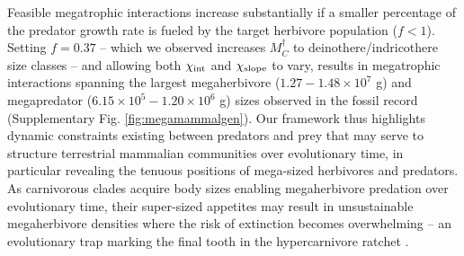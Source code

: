 \documentclass[]{rsos}%
\begin{document}
Feasible megatrophic interactions increase substantially if a smaller percentage of the predator growth rate is fueled by the target herbivore population ($f<1$).
Setting $f=0.37$ -- which we observed increases $M_C^\dagger$ to deinothere/indricothere size classes -- and allowing both $\chi_{\rm int}$ and $\chi_{\rm slope}$ to vary, results in megatrophic interactions spanning the largest megaherbivore ($1.27-1.48\times10^7$ g) and megapredator ($6.15\times10^5-1.20\times10^6$ g) sizes observed in the fossil record (Supplementary Fig. \ref{fig:megamammalgen}).
Our framework thus highlights dynamic constraints existing between predators and prey that may serve to structure terrestrial mammalian communities over evolutionary time, in particular revealing the tenuous positions of mega-sized herbivores and predators.
As carnivorous clades acquire body sizes enabling megaherbivore predation over evolutionary time, their super-sized appetites may result in unsustainable megaherbivore densities where the risk of extinction becomes overwhelming -- an evolutionary trap marking the final tooth in the hypercarnivore ratchet \cite[cf.][]{VanValkenburgh:2004p2451}.

\end{document}
